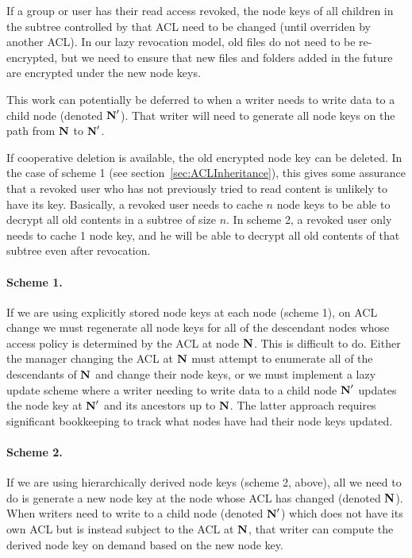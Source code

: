 If a group or user has their read access revoked, the node keys of all
children in the subtree controlled by that ACL need to be changed
(until overriden by another ACL). In our lazy revocation model, old
files do not need to be re-encrypted, but we need to ensure that new
files and folders added in the future are encrypted under the new node
keys.

This work can potentially be deferred to when a writer needs to write
data to a child node (denoted ${\textbf{N}}'$). That writer will need to
generate all node keys on the path from ${\textbf{N}}$ to ${\textbf{N}}'$.

If cooperative deletion is available, the old encrypted node key can
be deleted. In the case of scheme 1 (see
section~\ref{sec:ACLInheritance}), this gives some assurance that a
revoked user who has not previously tried to read content is unlikely
to have its key. Basically, a revoked user needs to cache $n$ node
keys to be able to decrypt all old contents in a subtree of size
$n$. In scheme 2, a revoked user only needs to cache 1 node key, and
he will be able to decrypt all old contents of that subtree even after
revocation.

\paragraph{Scheme 1.}
If we are using explicitly stored node keys at each node (scheme 1),
on ACL change we must regenerate all node keys for all of the
descendant nodes whose access policy is determined by the ACL at node
${\textbf{N}}$. This is difficult to do. Either the manager changing the ACL at
${\textbf{N}}$ must attempt to enumerate all of the descendants of ${\textbf{N}}$ and
change their node keys, or we must implement a lazy update scheme
where a writer needing to write data to a child node ${\textbf{N}}'$ updates the
node key at ${\textbf{N}}'$ and its ancestors up to ${\textbf{N}}$. The latter approach
requires significant bookkeeping to track what nodes have had their
node keys updated.

\paragraph{Scheme 2.}
If we are using hierarchically derived node keys (scheme 2, above),
all we need to do is generate a new node key at the node whose ACL has
changed (denoted ${\textbf{N}}$). When writers need to write to a child node
(denoted ${\textbf{N}}'$) which does not have its own ACL but is instead subject
to the ACL at ${\textbf{N}}$, that writer can compute the derived node key on
demand based on the new node key.


